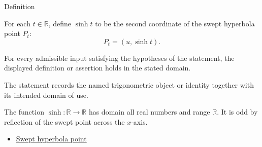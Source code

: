 

\begin{definitionbox}{Definition}
\begin{definition}
\label{def:hyperbolic-sine}
For each $t\in\mathbb{R}$, define $\sinh t$ to be the second coordinate of
the swept hyperbola point $P_t$:
\[
  P_t=(u,\sinh t).
\]
\end{definition}
\end{definitionbox}
\begin{remark*}
For every admissible input satisfying the hypotheses of the statement, the
displayed definition or assertion holds in the stated domain.
\end{remark*}

\begin{remark*}[Interpretation]
The statement records the named trigonometric object or identity together with
its intended domain of use.
\end{remark*}

\begin{remark*}
The function $\sinh:\mathbb{R}\to\mathbb{R}$ has domain all real numbers and
range $\mathbb{R}$. It is odd by reflection of the swept point across the
$x$-axis.
\end{remark*}
\begin{dependencies}
\begin{itemize}
  \item \hyperref[def:swept-hyperbola-point]{Swept hyperbola point}
\end{itemize}
\end{dependencies}
